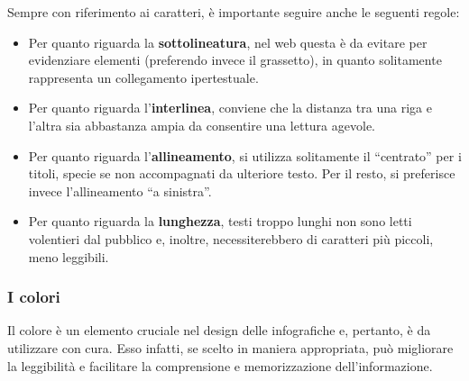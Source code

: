 Sempre con riferimento ai caratteri, è importante seguire anche le seguenti regole:
\begin{itemize}
    \item Per quanto riguarda la \textbf{sottolineatura}, nel web questa è da evitare per evidenziare elementi (preferendo invece il grassetto), in quanto solitamente rappresenta un collegamento 
    ipertestuale.
    \item Per quanto riguarda l'\textbf{interlinea}, conviene che la distanza tra una riga e l'altra sia abbastanza ampia da consentire una lettura agevole.
    \item Per quanto riguarda l'\textbf{allineamento}, si utilizza solitamente il ``centrato'' per i titoli, specie se non accompagnati da ulteriore testo. Per il resto, si preferisce invece l'allineamento
    ``a sinistra''.
    \item Per quanto riguarda la \textbf{lunghezza}, testi troppo lunghi non sono letti volentieri dal pubblico e, inoltre, necessiterebbero di caratteri più piccoli, meno leggibili.
\end{itemize}


\subsubsection{I colori}
Il colore è un elemento cruciale nel design delle infografiche e, pertanto, è da utilizzare con cura. 
Esso infatti, se scelto in maniera appropriata, può migliorare la leggibilità e facilitare la comprensione e memorizzazione dell'informazione.

